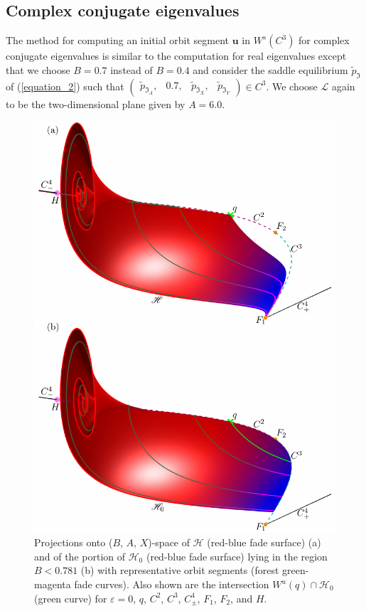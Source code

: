 \documentclass{ws-ijbc}
\begin{document}
\subsection{Complex conjugate eigenvalues}

The method for computing an initial orbit segment $\mathbf{u}$ in $W^{s}(C^3)$ for complex conjugate eigenvalues is similar to the computation for real eigenvalues except that we choose $B=0.7$ instead of $B=0.4$ and consider the saddle equilibrium $\tilde{p}_{\Im}$ of (\ref{equation_2}) such that $\begin{pmatrix}\tilde{p}_{\Im_A}, &0.7, &\tilde{p}_{\Im_X}, &\tilde{p}_{\Im_Y} \end{pmatrix} \in C^3$.  We choose $\mathscr{L}$ again to be the two-dimensional plane given by $A=6.0$.

\begin{figure}[H]
\centering
\includegraphics[]{./figures/MKMO_11.pdf}
\caption{Projections onto ($B$, $A$, $X$)-space of $\mathscr{H}$ (red-blue fade surface) (a) and of the portion of $\mathscr{H}_0$ (red-blue fade surface) lying in the region $B < 0.781$ (b) with representative orbit segments (forest green-magenta fade curves).  Also shown are the intersection $W^u(q)\cap\mathscr{H}_0$ (green curve) for $\varepsilon=0$, $q$, $C^2$, $C^3$, $C^4_\pm$, $F_1$, $F_2$, and $H$.}
\label{figure_11}
\end{figure}
\end{document}
